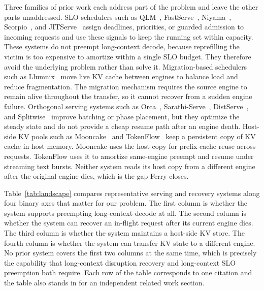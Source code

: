 Three families of prior work each address part of the problem and leave the other parts unaddressed. SLO schedulers such as QLM~\cite{qlm}, FastServe~\cite{fastserve}, Niyama~\cite{niyama}, Scorpio~\cite{scorpio}, and JITServe~\cite{jitserve} assign deadlines, priorities, or guarded admission to incoming requests and use these signals to keep the running set within capacity. These systems do not preempt long-context decode, because reprefilling the victim is too expensive to amortize within a single SLO budget. They therefore avoid the underlying problem rather than solve it. Migration-based schedulers such as Llumnix~\cite{llumnix} move live KV cache between engines to balance load and reduce fragmentation. The migration mechanism requires the source engine to remain alive throughout the transfer, so it cannot recover from a sudden engine failure. Orthogonal serving systems such as Orca~\cite{orca}, Sarathi-Serve~\cite{sarathi_serve}, DistServe~\cite{distserve}, and Splitwise~\cite{splitwise} improve batching or phase placement, but they optimize the steady state and do not provide a cheap resume path after an engine death. Host-side KV pools such as Mooncake~\cite{mooncake} and TokenFlow~\cite{tokenflow} keep a persistent copy of KV cache in host memory. Mooncake uses the host copy for prefix-cache reuse across requests. TokenFlow uses it to amortize same-engine preempt and resume under streaming text bursts. Neither system reads its host copy from a different engine after the original engine dies, which is the gap Ferry closes.


Table~\ref{tab:landscape} compares representative serving and recovery systems along four binary axes that matter for our problem. The first column is whether the system supports preempting long-context decode at all. The second column is whether the system can recover an in-flight request after its current engine dies. The third column is whether the system maintains a host-side KV store. The fourth column is whether the system can transfer KV state to a different engine. No prior system covers the first two columns at the same time, which is precisely the capability that long-context disruption recovery and long-context SLO preemption both require. Each row of the table corresponds to one citation and the table also stands in for an independent related work section.

